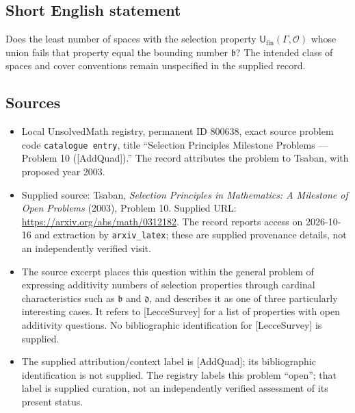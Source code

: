 \documentclass[11pt]{article}
\begin{document}
\subsection{Short English statement}
Does the least number of spaces with the selection property \(\mathsf{U}_{\mathrm{fin}}(\Gamma,\mathcal O)\) whose union fails that property equal the bounding number \(\mathfrak b\)? The intended class of spaces and cover conventions remain unspecified in the supplied record.
\subsection{Sources}
\begin{itemize}
\item Local UnsolvedMath registry, permanent ID \(800638\), exact source problem code \texttt{catalogue entry}, title ``Selection Principles Milestone Problems --- Problem 10 ([AddQuad]).'' The record attributes the problem to Tsaban, with proposed year 2003.
\item Supplied source: Tsaban, \emph{Selection Principles in Mathematics: A Milestone of Open Problems} (2003), Problem 10. Supplied URL: \url{https://arxiv.org/abs/math/0312182}. The record reports access on 2026-10-16 and extraction by \texttt{arxiv\_latex}; these are supplied provenance details, not an independently verified visit.
\item The source excerpt places this question within the general problem of expressing additivity numbers of selection properties through cardinal characteristics such as \(\mathfrak b\) and \(\mathfrak d\), and describes it as one of three particularly interesting cases. It refers to [LecceSurvey] for a list of properties with open additivity questions. No bibliographic identification for [LecceSurvey] is supplied.
\item The supplied attribution/context label is [AddQuad]; its bibliographic identification is not supplied. The registry labels this problem ``open''; that label is supplied curation, not an independently verified assessment of its present status.
\end{itemize}
\end{document}

